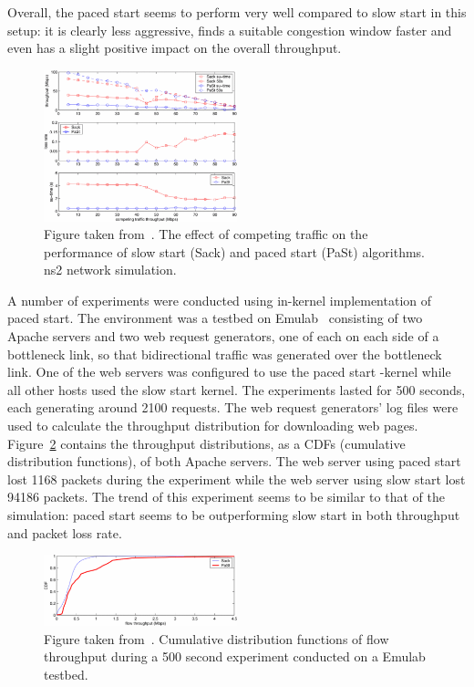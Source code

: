 Overall, the paced start seems to perform very well compared to slow start in this setup: it is clearly less aggressive, finds a suitable congestion window faster and even has a slight positive impact on the overall throughput.

\begin{figure}
	\includegraphics[width=0.5\textwidth]{images/hu03_competing_traffic.png}
	\caption{Figure taken from~\cite{Hu03}. The effect of competing traffic on the performance of slow start (Sack) and paced start (PaSt) algorithms. ns2 network simulation.}
	\label{fig:competing_traffic}
\end{figure}

A number of experiments were conducted using in-kernel implementation of paced start. The environment was a testbed on Emulab~\cite{Emulab} consisting of two Apache servers and two web request generators, one of each on each side of a bottleneck link, so that bidirectional traffic was generated over the bottleneck link. One of the web servers was configured to use the paced start -kernel while all other hosts used the slow start kernel. The experiments lasted for 500 seconds, each generating around 2100 requests. The web request generators' log files were used to calculate the throughput distribution for downloading web pages. Figure~\ref{fig:in_kernel} contains the throughput distributions, as a CDFs (cumulative distribution functions), of both Apache servers. The web server using paced start lost 1168 packets during the experiment while the web server using slow start lost 94186 packets. The trend of this experiment seems to be similar to that of the simulation: paced start seems to be outperforming slow start in both throughput and packet loss rate.

\begin{figure}
	\includegraphics[width=0.5\textwidth]{images/hu03_in_kernel.png}
	\caption{Figure taken from~\cite{Hu03}. Cumulative distribution functions of flow throughput during a 500 second experiment conducted on a Emulab testbed.}
	\label{fig:in_kernel}
\end{figure}






